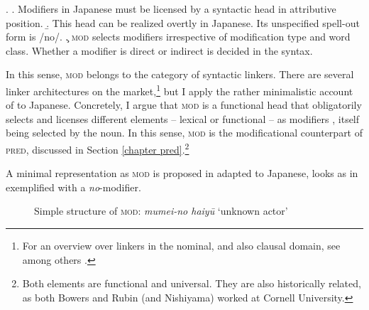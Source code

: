 \ex. \a. Modifiers in Japanese must be licensed by a syntactic head in attributive position.
\b. This head can be realized overtly in Japanese. Its unspecified spell-out form is /no/.
\c. \textsc{mod} selects modifiers irrespective of modification type and word class. Whether a modifier is direct or indirect is decided in the syntax.

In this sense, \textsc{mod} belongs to the category of syntactic linkers. There are several linker architectures on the market,\footnote{For an overview over linkers in the nominal, and also clausal domain, see among others \citealt{baker:2006:linkers, philip:2012:linkers, franco:2015:linkers, richards:2023:finding}.}  but I apply the rather minimalistic account of \citet{rubin:1994:mod, rubin:1996:transparent} to Japanese. Concretely, I argue that \textsc{mod} is a functional head that obligatorily selects and licenses different elements – lexical or functional – as modifiers \citep[36–40]{rubin:1994:mod}, itself being selected by the noun. In this sense, \textsc{mod} is the modificational counterpart of \textsc{pred}, discussed in Section \ref{chapter pred}.\footnote{Both elements are functional and universal. They are also historically related, as both Bowers and Rubin (and Nishiyama) worked at Cornell University.}

 A minimal representation as \textsc{mod} is proposed in \citet{rubin:1994:mod} adapted to Japanese, looks as in  exemplified with a \textit{no}-modifier.

\begin{figure}
\centering
{}
\caption{Simple structure of \textsc{mod}: \textit{mumei-no haiyū} `unknown actor'}
\label{Simple structure Mod}
\end{figure}

